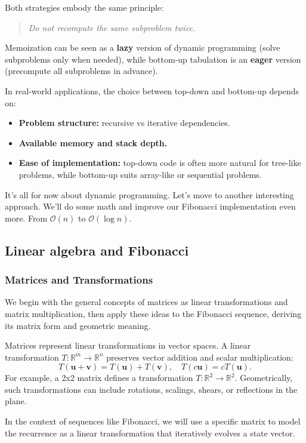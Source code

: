 \documentclass{article}
\begin{document}
Both strategies embody the same principle:
\begin{quote}
	\emph{Do not recompute the same subproblem twice.}
\end{quote}

Memoization can be seen as a \textbf{lazy} version of dynamic programming
(solve subproblems only when needed),
while bottom-up tabulation is an \textbf{eager} version
(precompute all subproblems in advance).

In real-world applications, the choice between top-down and bottom-up depends on:
\begin{itemize}
	\item \textbf{Problem structure:} recursive vs iterative dependencies.
	\item \textbf{Available memory and stack depth.}
	\item \textbf{Ease of implementation:} top-down code is often more natural for tree-like problems,
	while bottom-up suits array-like or sequential problems.
\end{itemize}
It's all for now about dynamic programming. Let's move to another interesting approach. We'll do some math and improve our Fibonacci implementation even more.
From $\mathcal{O}(n)$ to $\mathcal{O}(\log n)$.

\subsection{Linear algebra and Fibonacci}
\subsubsection{Matrices and Transformations}
We begin with the general concepts of matrices as linear transformations and matrix multiplication, then apply these ideas to the Fibonacci sequence, deriving its matrix form and geometric meaning.

Matrices represent linear transformations in vector spaces. A linear transformation \( T: \mathbb{R}^m \to \mathbb{R}^n \) preserves vector addition and scalar multiplication:
\[
T(\mathbf{u} + \mathbf{v}) = T(\mathbf{u}) + T(\mathbf{v}), \quad T(c \mathbf{u}) = c T(\mathbf{u}).
\]
For example, a 2x2 matrix defines a transformation \( T: \mathbb{R}^2 \to \mathbb{R}^2 \). Geometrically, such transformations can include rotations, scalings, shears, or reflections in the plane.

In the context of sequences like Fibonacci, we will use a specific matrix to model the recurrence as a linear transformation that iteratively evolves a state vector.
\end{document}
